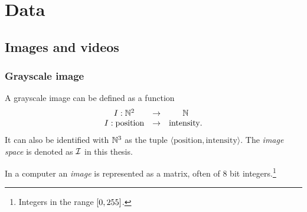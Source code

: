 

\section{Data}
\subsection{Images and videos}
\subsubsection{Grayscale image}
A grayscale image can be defined as a function
\begin{equation}
    \begin{array}{ccc}
    I : \mathbb{N}^2 &\rightarrow& \mathbb{N}\\
    I : \text{position}&\rightarrow&\text{intensity}.
    \end{array}
\end{equation}
It can also be identified with $\mathbb{N}^3$ as the tuple $\langle \text{position}, \text{intensity}\rangle$. The \emph{image space} is denoted as $\mathcal{I}$ in this thesis.

In a computer an \emph{image} is represented as a matrix, often of 8 bit integers.\footnote{Integers in the range $\left[0, 255\right]$.}

%


